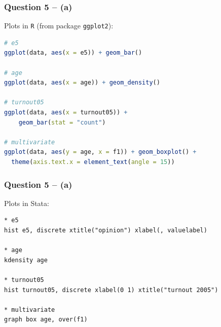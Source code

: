 \documentclass[xcolor=table]{beamer}
\begin{document}
\begin{frame}[fragile]
\frametitle{Question 5 -- (a)}
Plots in \texttt{R} (from package \texttt{ggplot2}): \pause
\begin{lstlisting}[language = R]
# e5
ggplot(data, aes(x = e5)) + geom_bar() 

# age
ggplot(data, aes(x = age)) + geom_density()

# turnout05
ggplot(data, aes(x = turnout05)) + 
	geom_bar(stat = "count")
	
# multivariate
ggplot(data, aes(y = age, x = f1)) + geom_boxplot() + 
  theme(axis.text.x = element_text(angle = 15))
\end{lstlisting}
\end{frame}

\begin{frame}[fragile]
\frametitle{Question 5 -- (a)}
Plots in Stata: \pause
\begin{lstlisting}
* e5
hist e5, discrete xtitle("opinion") xlabel(, valuelabel)

* age
kdensity age

* turnout05
hist turnout05, discrete xlabel(0 1) xtitle("turnout 2005")
	
* multivariate
graph box age, over(f1)
\end{lstlisting}
\end{frame}


\end{document}
